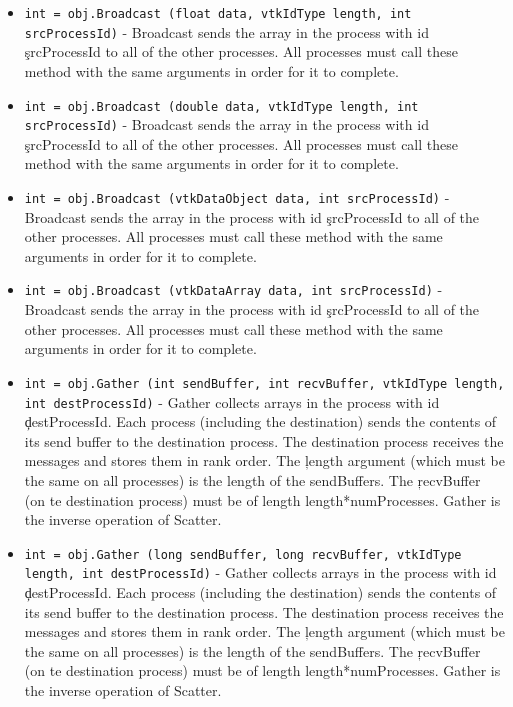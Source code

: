 \begin{itemize}
\item  \verb|int = obj.Broadcast (float data, vtkIdType length, int srcProcessId)| -  Broadcast sends the array in the process with id \c srcProcessId to all of
 the other processes.  All processes must call these method with the same
 arguments in order for it to complete.

\item  \verb|int = obj.Broadcast (double data, vtkIdType length, int srcProcessId)| -  Broadcast sends the array in the process with id \c srcProcessId to all of
 the other processes.  All processes must call these method with the same
 arguments in order for it to complete.

\item  \verb|int = obj.Broadcast (vtkDataObject data, int srcProcessId)| -  Broadcast sends the array in the process with id \c srcProcessId to all of
 the other processes.  All processes must call these method with the same
 arguments in order for it to complete.

\item  \verb|int = obj.Broadcast (vtkDataArray data, int srcProcessId)| -  Broadcast sends the array in the process with id \c srcProcessId to all of
 the other processes.  All processes must call these method with the same
 arguments in order for it to complete.

\item  \verb|int = obj.Gather (int sendBuffer, int recvBuffer, vtkIdType length, int destProcessId)| -  Gather collects arrays in the process with id \c destProcessId.  Each
 process (including the destination) sends the contents of its send buffer
 to the destination process.  The destination process receives the
 messages and stores them in rank order.  The \c length argument
 (which must be the same on all processes) is the length of the
 sendBuffers.  The \c recvBuffer (on te destination process) must be of
 length length*numProcesses.  Gather is the inverse operation of Scatter.

\item  \verb|int = obj.Gather (long sendBuffer, long recvBuffer, vtkIdType length, int destProcessId)| -  Gather collects arrays in the process with id \c destProcessId.  Each
 process (including the destination) sends the contents of its send buffer
 to the destination process.  The destination process receives the
 messages and stores them in rank order.  The \c length argument
 (which must be the same on all processes) is the length of the
 sendBuffers.  The \c recvBuffer (on te destination process) must be of
 length length*numProcesses.  Gather is the inverse operation of Scatter.


\end{itemize}
